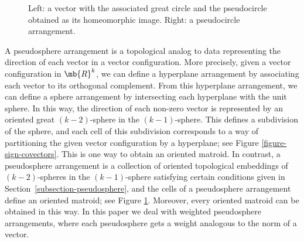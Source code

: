 \begin{figure}[htb]
\begin{center}
\end{center}

\caption{Left: a vector with the associated great circle and the pseudocircle obtained as its homeomorphic image.
Right: a pseudocircle arrangement.}
\label{figure-pseudosphere}

\end{figure}

A pseudosphere arrangement is a topological analog to data representing the direction of each vector in a vector configuration.
More precisely, given a vector configuration in $\mb{R}^k$, we can define a hyperplane arrangement by associating each vector to its orthogonal complement. From this hyperplane arrangement, we can define a sphere arrangement by intersecting each hyperplane with the unit sphere. In this way, the direction of each non-zero vector is represented by an oriented great $(k{-}2)$-sphere in the $(k{-}1)$-sphere.
This defines a subdivision of the sphere, and each cell of this subdivision corresponds to a way of partitioning the given vector configuration by a hyperplane; see Figure \ref{figure-sign-covectors}. This is one way to obtain an oriented matroid.
In contrast, a pseudosphere arrangement is a collection of oriented topological embeddings of $(k{-}2)$-spheres in the $(k{-}1)$-sphere satisfying certain conditions given in Section~\ref{subsection-pseudosphere}, and the cells of a pseudosphere arrangement define an oriented matroid; see Figure \ref{figure-pseudosphere}. Moreover, every oriented matroid can be obtained in this way.
In this paper we deal with weighted pseudosphere arrangements, where each pseudosphere gets a weight analogous to the norm of a vector.

